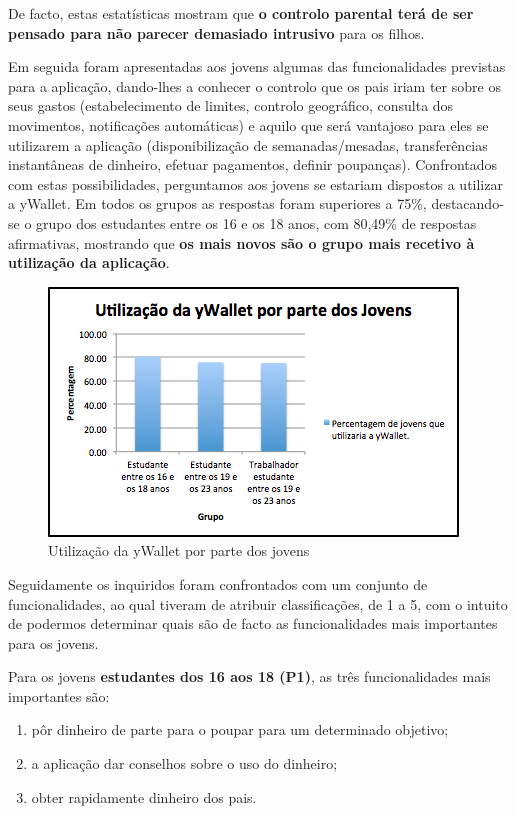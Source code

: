 \documentclass{article}
\begin{document}
      De facto, estas estatísticas mostram que \textbf{o controlo parental terá de ser pensado para não parecer demasiado intrusivo} para os filhos.

      Em seguida foram apresentadas aos jovens algumas das funcionalidades previstas para a aplicação, dando-lhes a conhecer o controlo que os pais iriam ter sobre os seus gastos (estabelecimento de limites, controlo geográfico, consulta dos movimentos, notificações automáticas) e aquilo que será vantajoso para eles se utilizarem a aplicação (disponibilização de semanadas/mesadas, transferências instantâneas de dinheiro, efetuar pagamentos, definir poupanças). Confrontados com estas possibilidades, perguntamos aos jovens se estariam dispostos a utilizar a yWallet. Em todos os grupos as respostas foram superiores a 75\%, destacando-se o grupo dos estudantes entre os 16 e os 18 anos, com 80,49\% de respostas afirmativas, mostrando que \textbf{os mais novos são o grupo mais recetivo à utilização da aplicação}.

      \begin{figure}[ht!]
        \centering
          \includegraphics[width=0.7\linewidth]{img/img5}
          \caption{Utilização da yWallet por parte dos jovens}
          \label{img5}
      \end{figure} 

      Seguidamente os inquiridos foram confrontados com um conjunto de funcionalidades, ao qual tiveram de atribuir classificações, de 1 a 5, com o intuito de podermos determinar quais são de facto as funcionalidades mais importantes para os jovens.

      Para os jovens \textbf{estudantes dos 16 aos 18 (P1)}, as três funcionalidades mais importantes são:

      \begin{enumerate}
        \item pôr dinheiro de parte para o poupar para um determinado objetivo;
        \item a aplicação dar conselhos sobre o uso do dinheiro;
        \item obter rapidamente dinheiro dos pais.
      \end{enumerate}
\end{document}
